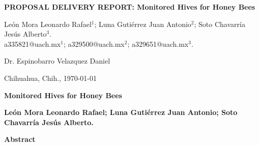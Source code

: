 \documentclass[12pt]{report}
\begin{document}
\begin{titlepage}
\begin{center}
\begin{center}
\begin{tabular}{ c c c }
				\end{tabular}
			\end{center}
			
			\vfill
			
			\Huge
			\textbf{PROPOSAL DELIVERY REPORT: Monitored Hives for Honey Bees}
			
			
			\vspace{3.5cm}
			
			{\small León Mora Leonardo Rafael${^1}$; Luna Gutiérrez Juan Antonio$^{2}$; Soto Chavarría Jesús Alberto$^{3}$.}\\
			{\small a335821@uach.mx${^1}$; a329500@uach.mx$^{2}$; a329651@uach.mx$^{3}$.}
			
			{\normalsize Dr. Espinobarro Velazquez Daniel}
			
			\vfill
			\vspace{0.8cm}
			
			\small
			Chihuahua, Chih., \today
			
		\end{center}
	\end{titlepage}
	
	\setcounter{page}{1}
	
	\thispagestyle{empty}
	\begin{center}
		\Large
		\textbf{Monitored Hives for Honey Bees}
		
		\vspace{0.05cm}
		\textbf{\footnotesize León Mora Leonardo Rafael; Luna Gutiérrez Juan Antonio; Soto Chavarría Jesús Alberto.}
		
		\vspace{0.2cm}
		\textbf{Abstract}
	\end{center}
	
\end{document}
